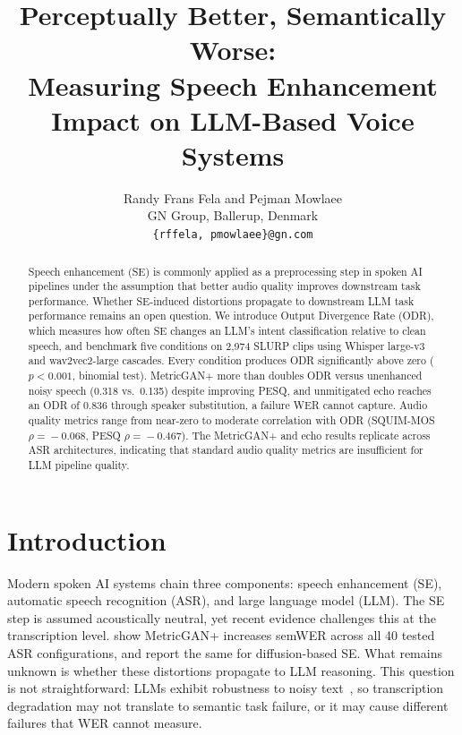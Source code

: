 \documentclass[11pt]{article}
\title{Perceptually Better, Semantically Worse:\\
Measuring Speech Enhancement Impact on
LLM-Based Voice Systems}
\author{
  Randy Frans Fela {\normalfont and}
  Pejman Mowlaee \\
  GN Group, Ballerup, Denmark\\
  \texttt{\{rffela, pmowlaee\}@gn.com}
}
\begin{document}
\maketitle

\begin{abstract}
Speech enhancement (SE) is commonly applied as a preprocessing step
in spoken AI pipelines under the assumption that better audio quality
improves downstream task performance. Whether SE-induced distortions
propagate to downstream LLM task performance remains an open question.
We introduce Output Divergence Rate (ODR), which measures how often SE
changes an LLM's intent classification relative to clean speech, and
benchmark five conditions on 2{,}974 SLURP clips using Whisper
large-v3 and wav2vec2-large cascades. Every condition produces ODR significantly above zero
($p < 0.001$, binomial test). MetricGAN{+}
more than doubles ODR versus unenhanced noisy speech (0.318 vs.\
0.135) despite improving PESQ, and unmitigated echo reaches an ODR of
0.836 through speaker substitution, a failure WER
cannot capture. Audio quality metrics range from near-zero to moderate correlation with ODR
(SQUIM-MOS $\rho\!=\!-0.068$, PESQ $\rho\!=\!-0.467$).
The MetricGAN{+} and echo results replicate across ASR
architectures, indicating that standard audio quality metrics are
insufficient for LLM pipeline quality.
\end{abstract}
 
\section{Introduction}
\label{sec:intro}
 
Modern spoken AI systems chain three components: speech enhancement
(SE), automatic speech recognition (ASR), and
large language model (LLM).
The SE step is assumed acoustically neutral, yet recent evidence
challenges this at the transcription level. \citet{chondhekar2025noising}
show MetricGAN{+} increases semWER across all 40 tested ASR
configurations, and \citet{islam2026denoising} report the same for
diffusion-based SE.
What remains unknown is whether these distortions propagate to LLM
reasoning. This question is not straightforward: LLMs exhibit
robustness to noisy text~\citep{chen2024voicebench, chen2026voicebench},
so transcription degradation may not translate to semantic task failure,
or it may cause different failures that WER cannot measure.
 
\end{document}
